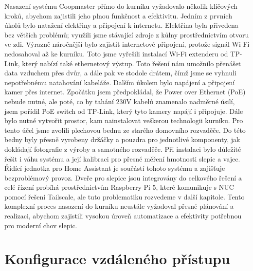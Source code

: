 Nasazení systému Coopmaster přímo do kurníku vyžadovalo několik klíčových kroků, abychom zajistili jeho plnou funkčnost a efektivitu.
Jedním z prvních úkolů bylo natažení elektřiny a připojení k internetu.
Elektřina byla přivedena bez větších problémů; využili jsme stávající zdroje z kůlny prostřednictvím otvoru ve zdi.
\newline
Výrazně náročnější bylo zajistit internetové připojení, protože signál Wi-Fi nedosahoval až ke kurníku.
Toto jsme vyřešili instalací Wi-Fi extenderu od TP-Link, který nabízí také ethernetový výstup.
Toto řešení nám umožnilo přenášet data vzduchem přes dvůr, a dále pak ve stodole drátem, čímž jsme se vyhnuli nepotřebnému natahování kabeláže.
\newline
Dalším úkolem bylo napájení a připojení kamer přes internet.
Zpočátku jsem předpokládal, že Power over Ethernet (PoE) nebude nutné, ale poté, co by tahání 230V kabelů znamenalo nadměrné úsilí, jsem pořídil PoE switch od TP-Link, který tyto kamery napájí i připojuje.
\newline
Dále bylo nutné vytvořit prostor, kam nainstalovat veškerou technologii kurníku.
Pro tento účel jsme zvolili plechovou bednu ze starého domovního rozvaděče.
Do této bedny byly přesně vyrobeny držáčky a pouzdra pro jednotlivé komponenty, jak dokládají fotografie z výroby a samotného rozvaděče.
\newline
Při instalaci bylo důležité řešit i váhu systému a její kalibraci pro přesné měření hmotnosti slepic a vajec.
Řídící jednotka pro Home Assistant je součástí tohoto systému a zajišťuje bezproblémový provoz.
Dveře pro slepice jsou integrovány do celkového řešení a celé řízení probíhá prostřednictvím Raspberry Pi 5, které komunikuje s NUC pomocí řešení Tailscale, ale tuto problematiku rozvedeme v další kapitole.
\newline
Tento komplexní proces nasazení do kurníku neustále vyžadoval přesné plánování a realizaci, abychom zajistili vysokou úroveň automatizace a efektivity potřebnou pro moderní chov slepic.

\newpage


\section{Konfigurace vzdáleného přístupu}\label{sec:konfigurace-vzdaleneho-pristupu}

